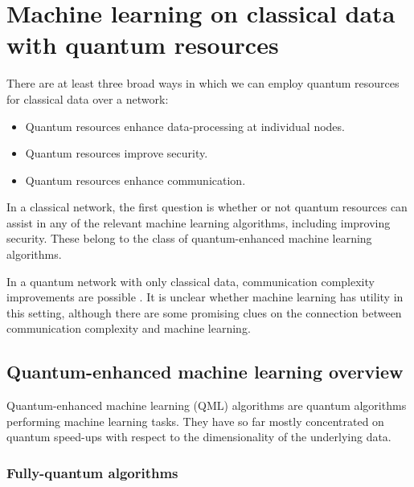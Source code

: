 \documentclass[twocolumn, aps, rmp, amsmath, amssymb, nofootinbib, superscriptaddress, longbibliography, floatfix, table-of-contents, eqsecnum]{revtex4}
\begin{document}
\section{Machine learning on classical data with quantum resources}

There are at least three broad ways in which we can employ quantum resources for classical data over a network:
\begin{itemize}
\item Quantum resources enhance data-processing at individual nodes.
\item Quantum resources improve security.
\item Quantum resources enhance communication.
\end{itemize}

In a classical network, the first question is whether or not quantum resources can assist in any of the relevant machine learning algorithms, including improving security. These belong to the class of quantum-enhanced machine learning algorithms.

In a quantum network with only classical data, communication complexity improvements are possible \cite{bib:brassard2003quantum}. It is unclear whether machine learning has utility in this setting, although there are some promising clues \cite{bib:kane2017communication, bib:balcan2012distributed, bib:conitzer2004communication} on the connection between communication complexity and machine learning.

\subsection{Quantum-enhanced machine learning overview}

Quantum-enhanced machine learning (QML) algorithms are quantum algorithms performing machine learning tasks. They have so far mostly concentrated on quantum speed-ups with respect to the dimensionality of the underlying data.

\subsubsection{Fully-quantum algorithms}
\end{document}
